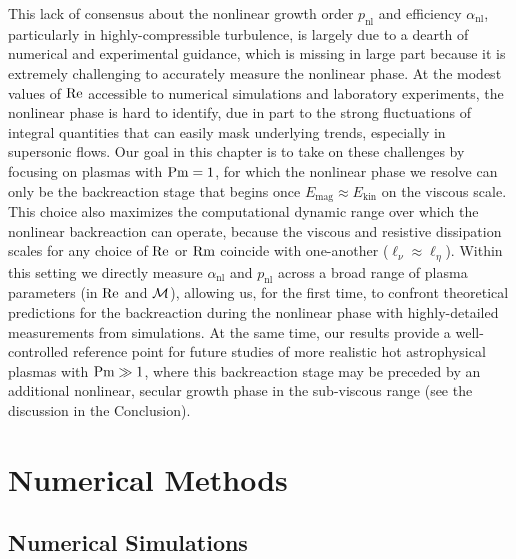    This lack of consensus about the nonlinear growth order $p_\mathrm{nl}$ and efficiency $\alpha_\mathrm{nl}$, particularly in highly-compressible turbulence, is largely due to a dearth of numerical and experimental guidance, which is missing in large part because it is extremely challenging to accurately measure the nonlinear phase. At the modest values of $\mathrm{Re}$ accessible to numerical simulations and laboratory experiments, the nonlinear phase is hard to identify, due in part to the strong fluctuations of integral quantities that can easily mask underlying trends, especially in supersonic flows. Our goal in this chapter is to take on these challenges by focusing on plasmas with $\mathrm{Pm} = 1$, for which the nonlinear phase we resolve can only be the backreaction stage that begins once $E_\mathrm{mag} \approx E_\mathrm{kin}$ on the viscous scale. This choice also maximizes the computational dynamic range over which the nonlinear backreaction can operate, because the viscous and resistive dissipation scales for any choice of $\mathrm{Re}$ or $\mathrm{Rm}$ coincide with one-another ($\ell_\nu \approx \ell_\eta$). Within this setting we directly measure $\alpha_\mathrm{nl}$ and $p_\mathrm{nl}$ across a broad range of plasma parameters (in $\mathrm{Re}$ and $\mathcal{M}$), allowing us, for the first time, to confront theoretical predictions for the backreaction during the nonlinear phase with highly-detailed measurements from simulations. At the same time, our results provide a well-controlled reference point for future studies of more realistic hot astrophysical plasmas with $\mathrm{Pm} \gg 1$, where this backreaction stage may be preceded by an additional nonlinear, secular growth phase in the sub-viscous range (see the discussion in the Conclusion).

\section{Numerical Methods}

\subsection{Numerical Simulations} \label{sec:methods:sims}

